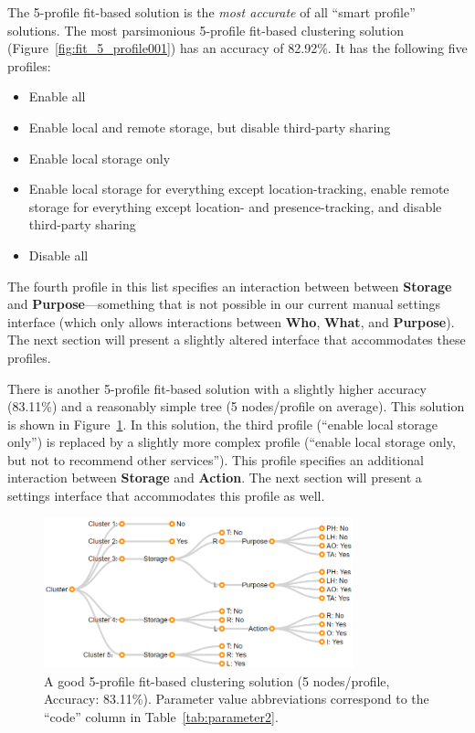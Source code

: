 The 5-profile fit-based solution is the \emph{most accurate} of all ``smart profile'' solutions. The most parsimonious 5-profile fit-based clustering solution (Figure~\ref{fig:fit_5_profile001}) has an accuracy of 82.92\%. It has the following five profiles:
\begin{itemize}
	\item Enable all
	\item Enable local and remote storage, but disable third-party sharing
	\item Enable local storage only
	\item Enable local storage for everything except location-tracking, enable remote storage for everything except location- and presence-tracking, and disable third-party sharing
	\item Disable all
\end{itemize}
The fourth profile in this list specifies an interaction between between \textbf{Storage} and \textbf{Purpose}---something that is not possible in our current manual settings interface (which only allows interactions between \textbf{Who}, \textbf{What}, and \textbf{Purpose}). The next section will present a slightly altered interface that accommodates these profiles.

There is another 5-profile fit-based solution with a slightly higher accuracy (83.11\%) and a reasonably simple tree (5 nodes/profile on average). This solution is shown in Figure~\ref{fig:fit_5_profile003}. In this solution, the third profile (``enable local storage only'') is replaced by a slightly more complex profile (``enable local storage only, but not to recommend other services''). This profile specifies an additional interaction between \textbf{Storage} and \textbf{Action}. The next section will present a settings interface that accommodates this profile as well.

\begin{figure}
	\centering
	\includegraphics[width=0.8\textwidth]{figures/fit_5_profile003.png}
	\caption{A good 5-profile fit-based clustering solution (5 nodes/profile, Accuracy: 83.11\%). Parameter value abbreviations correspond to the ``code'' column in Table~\ref{tab:parameter2}.}
	\label{fig:fit_5_profile003}
\end{figure}

